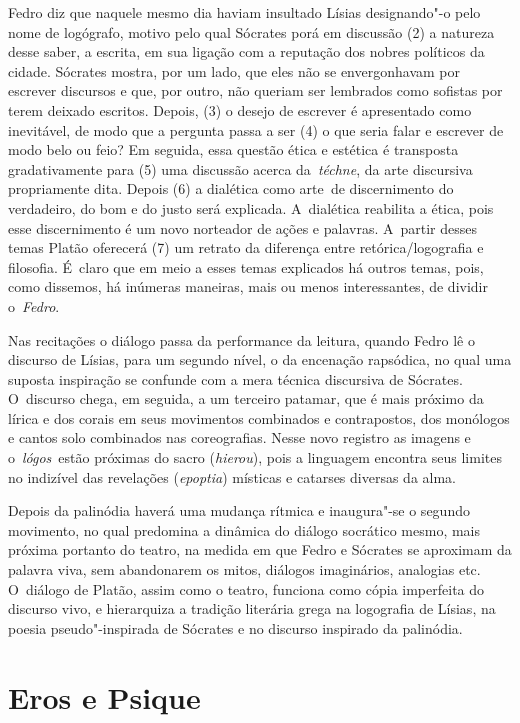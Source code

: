 Fedro diz que naquele mesmo dia haviam insultado Lísias designando"-o
pelo nome de logógrafo, motivo pelo qual Sócrates porá em discussão (2)
a natureza desse saber, a escrita, em sua ligação com a reputação dos
nobres políticos da cidade. Sócrates mostra, por um lado, que eles não
se envergonhavam por escrever discursos e que, por outro, não queriam
ser lembrados como sofistas por terem deixado escritos. Depois, (3) o
desejo de escrever é apresentado como inevitável, de modo que a pergunta
passa a ser (4) o que seria falar e escrever de modo belo ou feio? Em
seguida, essa questão ética e estética é transposta gradativamente para
(5) uma discussão acerca da~\emph{téchne}, da arte discursiva
propriamente dita. Depois (6) a dialética como arte\emph{~}de
discernimento do verdadeiro, do bom e do justo será explicada. A~dialética reabilita a ética, pois esse discernimento é um novo norteador
de ações e palavras. A~partir desses temas Platão oferecerá (7) um
retrato da diferença entre retórica/\allowbreak{}logografia e filosofia. É~claro que
em meio a esses temas explicados há outros temas, pois, como dissemos,
há inúmeras maneiras, mais ou menos interessantes, de dividir
o~\emph{Fedro}.

Nas recitações o diálogo passa da performance da leitura, quando Fedro
lê o discurso de Lísias, para um segundo nível, o da encenação
rapsódica, no qual uma suposta inspiração se confunde com a mera técnica
discursiva de Sócrates. O~discurso chega, em seguida, a um terceiro
patamar, que é mais próximo da lírica e dos corais em seus movimentos
combinados e contrapostos, dos monólogos e cantos solo combinados nas
coreografias. Nesse novo registro as imagens e o~\emph{lógos}~estão
próximas do sacro (\emph{hierou}), pois a linguagem encontra seus
limites no indizível das revelações (\emph{epoptia}) místicas e catarses
diversas da alma.

Depois da palinódia haverá uma mudança rítmica e inaugura"-se o segundo
movimento, no qual predomina a dinâmica do diálogo socrático mesmo, mais
próxima portanto do teatro, na medida em que Fedro e Sócrates se
aproximam da palavra viva, sem abandonarem os mitos, diálogos
imaginários, analogias etc. O~diálogo de Platão, assim como o teatro,
funciona como cópia imperfeita do discurso vivo, e hierarquiza a
tradição literária grega na logografia de Lísias, na poesia
pseudo"-inspirada de Sócrates e no discurso inspirado da palinódia.

 

\section{Eros e Psique}

